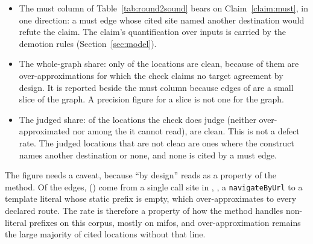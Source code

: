 \begin{itemize}
\item The must column of Table~\ref{tab:round2sound} bears on Claim~\ref{claim:must}, in one
direction: a must edge whose cited site named another destination would refute the claim. The claim's
quantification over inputs is carried by the demotion rules (Section~\ref{sec:model}).
\item The whole-graph share: only \RoundTwoGraphClean{} of the locations are clean, because
\RoundTwoOverApprox{} of them are over-approximations for which the check claims no target agreement by
design. It is reported beside the must column because \CensusMust{} edges of \CensusEdges{} are a
small slice of the graph. A precision figure for a slice is not one for the graph.
\item The judged share: of the \RoundTwoJudged{} locations the check does judge (neither
over-approximated nor among the \RoundTwoUnreadSites{} it cannot read), \RoundTwoJudgedClean{} are
clean. This is not a defect rate. The judged locations that are not clean are ones where the construct
names another destination or none, and none is cited by a must edge.
\end{itemize}

The \RoundTwoOverApprox{} figure needs a caveat, because ``by design'' reads as a property of the
method. Of the \RoundTwoEdges{} edges, \RoundTwoTopFanoutShare{} (\RoundTwoTopFanoutEdges{}) come from a
single call site in \RoundTwoTopFanoutApp{}, \RoundTwoTopFanoutSite{}, a \texttt{navigateByUrl} to a
template literal whose static prefix is empty, which over-approximates to every declared route.
The rate is therefore a property of how the method handles non-literal prefixes on this corpus, mostly
on mifos, and over-approximation remains the large majority of cited locations without that line.

\begin{table}[t]\footnotesize
\caption{The route configuration the framework holds, against the extractor's node set, as
recorded by the runtime route oracle of 29 and 30 October (Table~\ref{tab:provenance}).
\emph{Routes} counts the route entries the configuration holds once every lazy subtree is
expanded, and \emph{mounted} the addresses among them at which the router places a component on
the primary outlet. \emph{Not mounted} counts nodes the extractor declares at an address the
framework mounts nothing at. \emph{Not minted} counts addresses the framework mounts and the
extractor has no node for, and \emph{prefix only} those further addresses the framework's
configuration holds where a component is placed but no screen of the address's own is: in
\ProbeMissedPrefixUnanswered{} the route is a prefix with no empty-path child, and in
\ProbeMissedPrefixRedirect{} its empty-path child is a redirect, and in neither case is the
extractor wrong to mint no screen there.
\emph{Incomplete} is the extractor's own statement, from its soundiness notes, that part of the
route set was beyond it.}
\label{tab:probe}
\TabProbe
\end{table}



